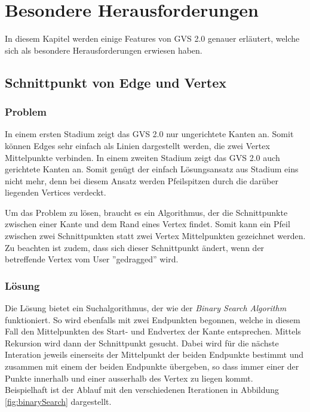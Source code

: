 \documentclass[11pt,a4paper,english,oneside]{book}
\numberwithin{equation}{chapter}
\begin{document}
	\section{Besondere Herausforderungen}
	In diesem Kapitel werden einige Features von GVS 2.0 genauer erläutert, welche sich als besondere Herausforderungen erwiesen haben.
	
	\subsection{Schnittpunkt von Edge und Vertex}
	\subsubsection{Problem}
	In einem ersten Stadium zeigt das GVS 2.0 nur ungerichtete Kanten an. Somit können Edges sehr einfach als Linien dargestellt werden, die zwei Vertex Mittelpunkte verbinden. In einem zweiten Stadium zeigt das GVS 2.0 auch gerichtete Kanten an. Somit genügt der einfach Lösungsansatz aus Stadium eins nicht mehr, denn bei diesem Ansatz werden Pfeilspitzen durch die darüber liegenden Vertices verdeckt.
	
	Um das Problem zu lösen, braucht es ein Algorithmus, der die Schnittpunkte zwischen einer Kante und dem Rand eines Vertex findet. Somit kann ein Pfeil zwischen zwei Schnittpunkten statt zwei Vertex Mittelpunkten gezeichnet werden. Zu beachten ist zudem, dass sich dieser Schnittpunkt ändert, wenn der betreffende Vertex vom User ''gedragged'' wird.
	
	\subsubsection{Lösung}
	Die Lösung bietet ein Suchalgorithmus, der wie der \textit{Binary Search Algorithm} \cite{adbook} funktioniert. So wird ebenfalls mit zwei Endpunkten begonnen, welche in diesem Fall den Mittelpunkten des Start- und Endvertex der Kante entsprechen. Mittels Rekursion wird dann der Schnittpunkt gesucht. Dabei wird für die nächste Interation jeweils einerseits der Mittelpunkt der beiden Endpunkte bestimmt und zusammen mit einem der beiden Endpunkte übergeben, so dass immer einer der Punkte innerhalb und einer ausserhalb des Vertex zu liegen kommt. \\
	Beispielhaft ist der Ablauf mit den verschiedenen Iterationen in Abbildung \ref{fig:binarySearch} dargestellt.
	
\end{document}
